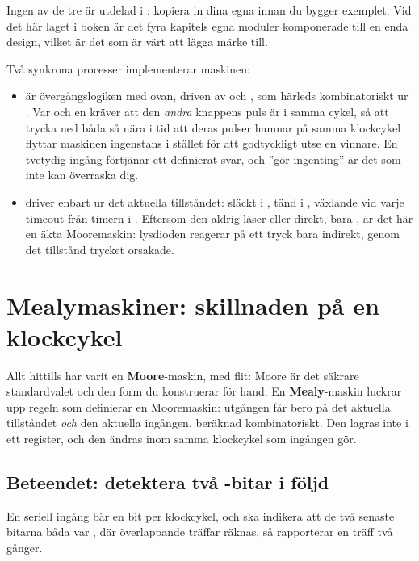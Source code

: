 Ingen av de tre är utdelad i : kopiera in dina egna innan du bygger exemplet. Vid det
här laget i boken är det fyra kapitels egna moduler komponerade till en enda design, vilket är det
som är värt att lägga märke till.


Två synkrona processer implementerar maskinen:
\begin{itemize}
  \item {} är övergångslogiken med  ovan, driven av
     och , som härleds kombinatoriskt ur
    . Var och en kräver att den \emph{andra} knappens puls är  i
    samma cykel, så att trycka ned båda så nära i tid att deras pulser hamnar på samma klockcykel
    flyttar maskinen ingenstans i stället för att godtyckligt utse en vinnare. En tvetydig ingång
    förtjänar ett definierat svar, och ”gör ingenting” är det som inte kan överraska dig.
  \item {} driver  enbart ur det aktuella tillståndet: släckt i
    , tänd i , växlande vid varje timeout från timern i
    . Eftersom den aldrig läser  eller 
    direkt, bara , är det här en äkta Mooremaskin: lysdioden reagerar på ett tryck bara
    indirekt, genom det tillstånd trycket orsakade.
\end{itemize}

\section{Mealymaskiner: skillnaden på en klockcykel}
\label{c8:sec:mealy}

Allt hittills har varit en \textbf{Moore}-maskin, med flit: Moore är det säkrare standardvalet och
den form du konstruerar för hand. En \textbf{Mealy}-maskin luckrar upp regeln som definierar en
Mooremaskin: utgången får bero på det aktuella tillståndet \emph{och} den aktuella ingången,
beräknad kombinatoriskt. Den lagras inte i ett register, och den ändras inom samma klockcykel som
ingången gör.

\subsection*{Beteendet: detektera två -bitar i följd}
En seriell ingång  bär en bit per klockcykel, och  ska indikera att de två senaste
bitarna båda var , där överlappande träffar räknas, så  rapporterar en träff två
gånger.

